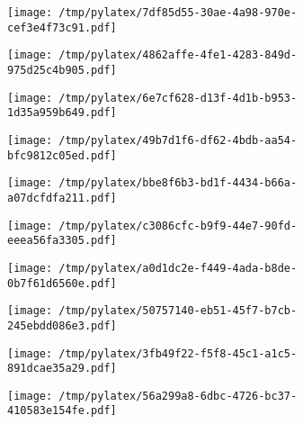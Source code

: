 \documentclass{article}
\begin{document}
\begin{figure}[htbp]
\begin{subfigure}[b]{.3\linewidth}
\texttt{[image: /tmp/pylatex/7df85d55-30ae-4a98-970e-cef3e4f73c91.pdf]}
\end{subfigure}
\begin{subfigure}[b]{.3\linewidth}
\texttt{[image: /tmp/pylatex/4862affe-4fe1-4283-849d-975d25c4b905.pdf]}
\end{subfigure}
\begin{subfigure}[b]{.3\linewidth}
\texttt{[image: /tmp/pylatex/6e7cf628-d13f-4d1b-b953-1d35a959b649.pdf]}
\end{subfigure}
\begin{subfigure}[b]{.3\linewidth}
\texttt{[image: /tmp/pylatex/49b7d1f6-df62-4bdb-aa54-bfc9812c05ed.pdf]}
\end{subfigure}
\begin{subfigure}[b]{.3\linewidth}
\texttt{[image: /tmp/pylatex/bbe8f6b3-bd1f-4434-b66a-a07dcfdfa211.pdf]}
\end{subfigure}
\begin{subfigure}[b]{.3\linewidth}
\texttt{[image: /tmp/pylatex/c3086cfc-b9f9-44e7-90fd-eeea56fa3305.pdf]}
\end{subfigure}
\begin{subfigure}[b]{.3\linewidth}
\texttt{[image: /tmp/pylatex/a0d1dc2e-f449-4ada-b8de-0b7f61d6560e.pdf]}
\end{subfigure}
\begin{subfigure}[b]{.3\linewidth}
\texttt{[image: /tmp/pylatex/50757140-eb51-45f7-b7cb-245ebdd086e3.pdf]}
\end{subfigure}
\begin{subfigure}[b]{.3\linewidth}
\texttt{[image: /tmp/pylatex/3fb49f22-f5f8-45c1-a1c5-891dcae35a29.pdf]}
\end{subfigure}
\begin{subfigure}[b]{.3\linewidth}
\texttt{[image: /tmp/pylatex/56a299a8-6dbc-4726-bc37-410583e154fe.pdf]}
\end{subfigure}
\end{figure}
\end{document}
